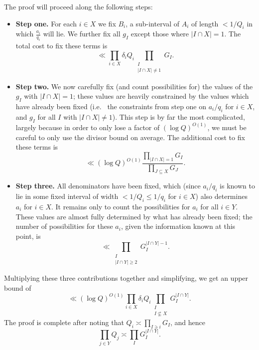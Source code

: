 \documentclass[11pt,letterpaper]{amsart}
\newcommand{\abs}[1]{\left\lvert #1\right\rvert}
\theoremstyle{definition}
\begin{document}
The proof will proceed along the following steps:
\begin{itemize}
\item \textbf{Step one.} For each $i \in X$ we fix $B_i$, a sub-interval of $A_i$ of length $< 1/Q_i$ in which $\frac{a_i}{q_i}$ will lie. We further fix all $g_I$ except those where $|I \cap X| = 1$. The total cost to fix these terms is
\begin{equation*}
\ll \prod_{i \in X} \delta_iQ_i\prod_{\substack{I \\ |I \cap X|\neq 1}} G_I.
\end{equation*}
\item \textbf{Step two.} We now carefully fix (and count possibilities for) the values of the $g_I$ with $|I \cap X| = 1$; these values are heavily constrained by the values which have already been fixed (i.e.~ the constraints from step one on $a_i/q_i$ for $i \in X$, and $g_I$ for all $I$ with $|I \cap X| \ne 1$). This step is by far the most complicated, largely because in order to only lose a factor of $(\log Q)^{O(1)}$, we must be careful to only use the divisor bound on average. The additional cost to fix these terms is
\begin{equation*}
\ll (\log Q)^{O(1)} \frac{\prod_{\abs{I\cap X}=1}G_I}{\prod_{J\subseteq X}G_J}.
\end{equation*}
\item \textbf{Step three.} All denominators have been fixed, which (since $a_i/q_i$ is known to lie in some fixed interval of width $<1/Q_i\leq 1/q_i$ for $i\in X$) also determines $a_i$ for $i \in X$. It remains only to count the possibilities for $a_i$ for all $i \in Y$. These values are almost fully determined by what has already been fixed; the number of possibilities for these $a_i$, given the information known at this point, is 
\begin{equation*}
\ll \prod_{\substack{I\\ \abs{I\cap Y}\geq 2}}G_I^{\abs{I\cap Y}-1}.
\end{equation*}
\end{itemize}

Multiplying these three contributions together and simplifying, we get an upper bound of
\begin{equation*}
\ll (\log Q)^{O(1)} \prod_{i \in X} \delta_i Q_i \prod_{\substack{I \\ I \not\subseteq X}} G_I^{|I \cap Y|}.
\end{equation*}
The proof is complete after noting that $Q_i\asymp \prod_{I \ni i}G_I$, and hence 
\[\prod_{j\in Y}Q_j\asymp \prod_I G_I^{\abs{I\cap Y}}.\]
\end{document}

